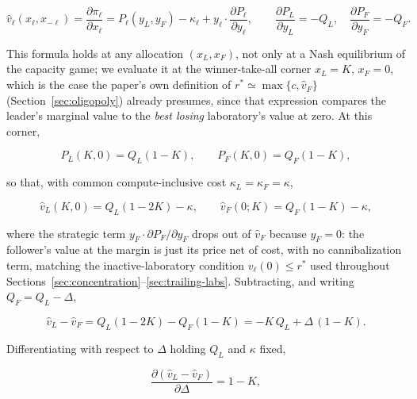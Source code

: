 \documentclass[11pt]{article}
\begin{document}
\begin{equation}\widehat v_\ell(x_\ell,x_{-\ell})=\frac{\partial\pi_\ell}{\partial x_\ell}=P_\ell(y_L,y_F)-\kappa_\ell+y_\ell\cdot\frac{\partial P_\ell}{\partial y_\ell},\qquad \frac{\partial P_L}{\partial y_L}=-Q_L,\quad\frac{\partial P_F}{\partial y_F}=-Q_F.\end{equation}

This formula holds at any allocation $(x_L,x_F)$, not only at a Nash equilibrium of the capacity game; we evaluate it at the winner-take-all corner $x_L=K$, $x_F=0$, which is the case the paper's own definition of $r^*\simeq\max\{c,\widehat v_F\}$ (Section~\ref{sec:oligopoly}) already presumes, since that expression compares the leader's marginal value to the \emph{best losing} laboratory's value at zero. At this corner,

\begin{equation}P_L(K,0)=Q_L(1-K),\qquad P_F(K,0)=Q_F(1-K),\end{equation}

so that, with common compute-inclusive cost $\kappa_L=\kappa_F=\kappa$,

\begin{equation}\widehat v_L(K,0)=Q_L(1-2K)-\kappa,\qquad \widehat v_F(0;K)=Q_F(1-K)-\kappa,\end{equation}

where the strategic term $y_F\cdot\partial P_F/\partial y_F$ drops out of $\widehat v_F$ because $y_F=0$: the follower's value at the margin is just its price net of cost, with no cannibalization term, matching the inactive-laboratory condition $v_\ell(0)\leq r^*$ used throughout Sections~\ref{sec:concentration}--\ref{sec:trailing-labs}. Subtracting, and writing $Q_F=Q_L-\Delta$,

\begin{equation}\widehat v_L-\widehat v_F=Q_L(1-2K)-Q_F(1-K)=-K\,Q_L+\Delta\,(1-K).\end{equation}

Differentiating with respect to $\Delta$ holding $Q_L$ and $\kappa$ fixed,

\begin{equation}\frac{\partial(\widehat v_L-\widehat v_F)}{\partial\Delta}=1-K,\end{equation}
\end{document}
